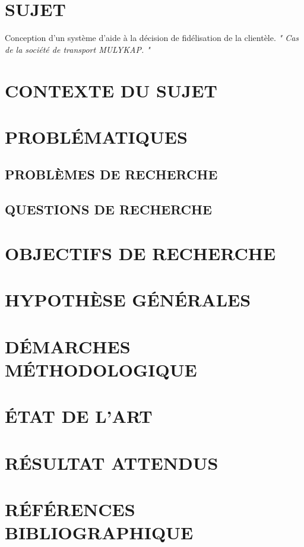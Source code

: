 \documentclass[a4paper,12pt]{article}
\begin{document}
\section[Sujet]{SUJET}
\begin{center}
    Conception d’un système d’aide à la décision 
    de fidélisation de la clientèle.
    \textit{" Cas de la société de transport MULYKAP. "}        
\end{center}

\section[Context du sujet]{CONTEXTE DU SUJET}

\section[Problématique]{PROBLÉMATIQUES}
\subsection[Problèmes de recherche]{PROBLÈMES DE RECHERCHE}
\subsection[Questions de recherche]{QUESTIONS DE RECHERCHE}

\section[Objectifs de recherche]{OBJECTIFS DE RECHERCHE}

\section[Hyposthèses générales]{HYPOTHÈSE GÉNÉRALES}


\section[Démarches méthodologiques]{DÉMARCHES MÉTHODOLOGIQUE}

\section[Etat de l'art]{ÉTAT DE L’ART}

\section[Résultats attenus]{RÉSULTAT ATTENDUS}

\section[Références bibliographiques]{RÉFÉRENCES BIBLIOGRAPHIQUE}
\end{document}
